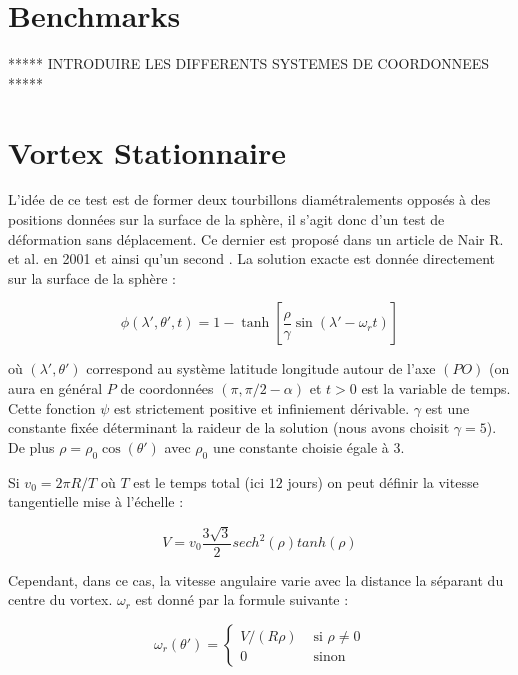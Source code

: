 \section{Benchmarks}

***** INTRODUIRE LES DIFFERENTS SYSTEMES DE COORDONNEES *****

\section{Vortex Stationnaire}

L'idée de ce test est de former deux tourbillons diamétralements opposés à des positions données sur la surface de la sphère, il s'agit donc d'un test de déformation sans déplacement. Ce dernier est proposé dans un article de Nair R. et al. en 2001 \cite{Nair2001} et ainsi qu'un second \cite{Nair1999}.
La solution exacte est donnée directement sur la surface de la sphère :

\begin{equation}
\phi ( \lambda' , \theta', t ) = 1 - \tanh \left[ \dfrac{\rho}{\gamma} \sin ( \lambda' - \omega_r t ) \right]
\label{NM_exacte}
\end{equation}

où $( \lambda' , \theta' )$ correspond au système latitude longitude autour de l'axe $(PO)$ (on aura en général $P$ de coordonnées $(\pi , \pi / 2 - \alpha )$ et $t>0$ est la variable de temps. Cette fonction $\psi$ est strictement positive et infiniement dérivable. $\gamma$ est une constante fixée déterminant la raideur de la solution (nous avons choisit $\gamma = 5$). De plus $\rho = \rho_0 \cos ( \theta' )$ avec $\rho_0$ une constante choisie égale à $3$.

Si $v_0 = 2 \pi R / T$ où $T$ est le temps total (ici $12$ jours) on peut définir la vitesse tangentielle mise à l'échelle :

\begin{equation}
  V = v_0 \dfrac{3 \sqrt{3} }{2} sech^2 ( \rho ) tanh ( \rho )
  \label{vitesse_tangentielle}
\end{equation} 

Cependant, dans ce cas, la vitesse angulaire varie avec la distance la séparant du centre du vortex. $\omega_r$ est donné par la formule suivante :

\begin{equation}
   \omega_r ( \theta' ) = \left\{ 
   \begin{array}{ll}
      V/( R \rho ) & \text{ si } \rho \neq 0 \\
      0 & \text{ sinon }
   \end{array}
   \right.
\label{vitesse_angulaire}
\end{equation}

